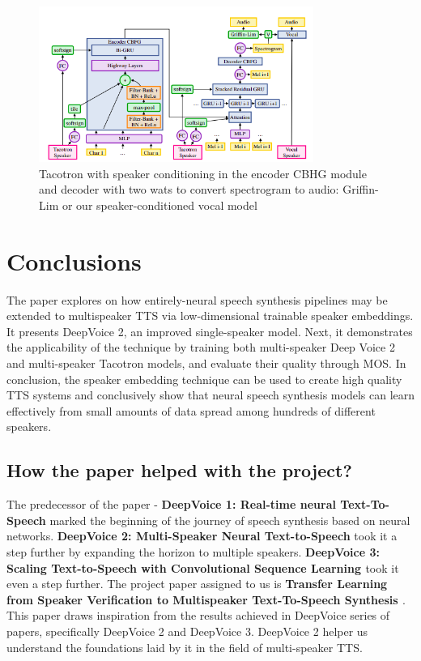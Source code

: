 \documentclass[twosided]{article}
\begin{document}
\begin{figure}[h]
    \centering
    \includegraphics[width=0.8\textwidth]{images/Figure3.png}
    \caption{Tacotron with speaker conditioning in the encoder CBHG module and decoder with two wats to convert spectrogram to audio: Griffin-Lim or our speaker-conditioned vocal model}
    \label{fig:figure2}
\end{figure}

\section*{Conclusions}
The paper explores on how entirely-neural speech synthesis pipelines may be extended to multispeaker TTS via low-dimensional trainable speaker embeddings. It presents DeepVoice 2, an improved single-speaker model. Next, it demonstrates the applicability of the technique by training both multi-speaker Deep Voice 2 and multi-speaker Tacotron models, and evaluate their quality through MOS. In conclusion, the speaker embedding technique can be used to create high quality TTS systems and conclusively show that neural speech synthesis models can learn effectively from small amounts of data spread among hundreds of different speakers.

\subsection*{How the paper helped with the project?}
The predecessor of the paper - \textbf{DeepVoice 1: Real-time neural Text-To-Speech} marked the beginning of the journey of speech synthesis based on neural networks. \textbf{DeepVoice 2: Multi-Speaker Neural Text-to-Speech} took it a step further by expanding the horizon to multiple speakers. \textbf{DeepVoice 3: Scaling Text-to-Speech with Convolutional Sequence Learning \cite{DeepVoice3}} took it even a step further. The project paper assigned to us is \textbf{Transfer Learning from Speaker Verification to Multispeaker Text-To-Speech Synthesis \cite{TransferLearning}}. This paper draws inspiration from the results achieved in DeepVoice series of papers, specifically DeepVoice 2 and DeepVoice 3. DeepVoice 2 helper us understand the foundations laid by it in the field of multi-speaker TTS. 
    
\end{document}
